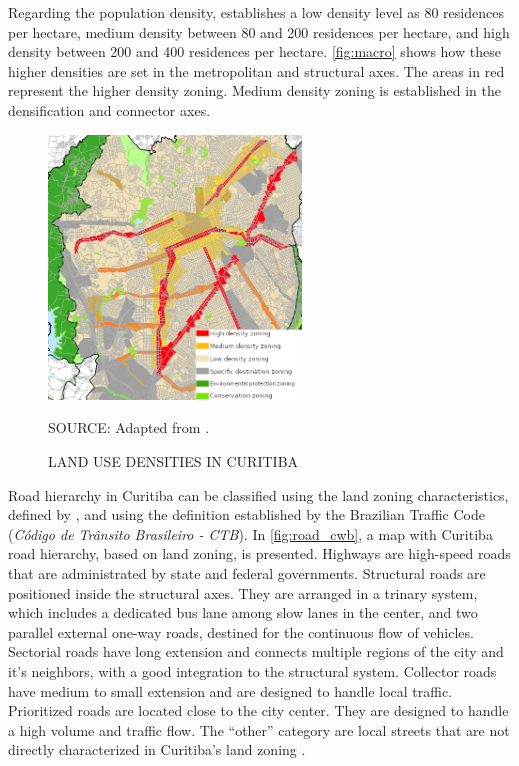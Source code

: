 Regarding the population density, \textcite{Curitiba2015} establishes a low density level as 80 residences per hectare, medium density between 80 and 200 residences per hectare, and high density between 200 and 400 residences per hectare. \autoref{fig:macro} shows how these higher densities are set in the metropolitan and structural axes. The areas in red represent the higher density zoning. Medium density zoning is established in the densification and connector axes. 

\begin{figure}[!htbp]
    \centering\footnotesize
    \captionsetup{font=footnotesize}
    \caption{LAND USE DENSITIES IN CURITIBA}
    \includegraphics[width=0.6\textwidth]{fig/macro3.png}
    \label{fig:macro}
    \par SOURCE: Adapted from \textcite{Curitiba2015}.
\end{figure}

Road hierarchy in Curitiba can be classified using the land zoning characteristics, defined by \textcite{Curitiba2019a}, and using the definition established by the Brazilian Traffic Code (\textit{Código de Trânsito Brasileiro - CTB}). In \autoref{fig:road_cwb}, a map with Curitiba road hierarchy, based on land zoning, is presented. Highways are high-speed roads that are administrated by state and federal governments. Structural roads are positioned inside the structural axes. They are arranged in a trinary system, which includes a dedicated bus lane among slow lanes in the center, and two parallel external one-way roads, destined for the continuous flow of vehicles. Sectorial roads have long extension and connects multiple regions of the city and it's neighbors, with a good integration to the structural system. Collector roads have medium to small extension and are designed to handle local traffic. Prioritized roads are located close to the city center. They are designed to handle a high volume and traffic flow. The ``other'' category are local streets that are not directly characterized in Curitiba's land zoning \cite{Curitiba2019a}. 

